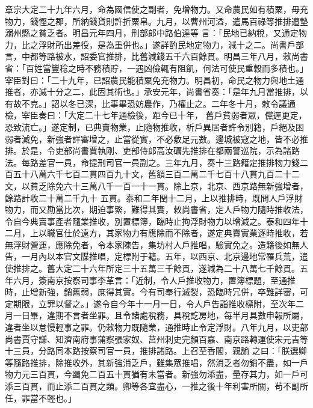 \begin{pinyinscope}
 章宗大定二十九年六月，命為國信使之副者，免增物力。又命農民如有積粟，毋充物力，錢慳之郡，所納錢貨則許折粟帛。九月，以曹州河溢，遣馬百祿等推排遭墊溺州縣之貧乏者。明昌元年四月，刑部郎中路伯達等
 言：「民地已納稅，又通定物力，比之浮財所出差役，是為重併也。」遂詳酌民地定物力，減十之二。尚書戶部言，中都等路被水，詔委官推排，比舊減錢五千六百餘貫。明昌三年八月，敕尚書省：「百姓當豐稔之時不務積貯，一遇凶儉輒有阻飢，何法可使民重穀而多積也。」宰臣對曰：「二十九年，已詔農民能積粟免充物力。明昌初，命民之物力與地土通推者，亦減十分之二，此固其術也。」承安元年，尚書省奏：「是年九月當推排，以有故不克。」詔以冬已深，比事畢恐妨農作，乃權止之。二年冬十月，敕令議通檢，宰臣奏曰：「大定二十七年通檢後，距今已十年，
 舊戶貧弱者眾，儻遲更定，恐致流亡。」遂定制，已典賣物業，止隨物推收，析戶異居者許令別籍，戶絕及困弱者減免，新強者詳審增之，止當從實，不必敷足元數。邊城被寇之地，皆不必推排。於是，令吏部尚書賈執剛、吏部侍郎高汝礪先推排在都兩警巡院，示為諸路法。每路差官一員，命提刑司官一員副之。三年九月，奏十三路籍定推排物力錢二百五十八萬六千七百二貫四百九十文，舊額三百二萬二千七百十八貫九百二十二文，以貧乏除免六十三萬八千一百一十一貫。除上京，北京、西京路無新強增者，餘路計收二十萬二千九十
 五貫。泰和二年閏十二月，上以推排時，既問人戶浮財物力，而又勘當比次，期迫事繁，難得其實，敕尚書省，定人戶物力隨時推收法，令自今典賣事產者隨業推收，別置標簿，臨時止拘浮財物力以增減之。泰和四年十二月，上以職官仕於遠方，其家物力有應除而不除者，遂定典賣實業逐時推收，若無浮財營運，應除免者，令本家陳告，集坊村人戶推唱，驗實免之。造籍後如無人告，一月內以本官文牒推唱，定標附于籍。五年，以西京、北京邊地常罹兵荒，遣使推排之。舊大定二十六年所定三十五萬三千餘貫，遂減為二十八萬七千餘貫。五
 年六月，簽南京按察司事李革言：「近制，令人戶推收物力，置簿標題，至通推時，止增新強，銷舊弱，庶得其實。今有司奉行滅裂，恐臨時冗併，卒難詳審，可定期限，立罪以督之。」遂令自今年十一月一日，令人戶告詣推收標附，至次年二月一日畢，違期不言者坐罪。且令諸處稅務，具稅訖房地，每半月具數申報所屬，違者坐以怠慢輕事之罪。仍敕物力既隨業，通推時止令定浮財。八年九月，以吏部尚書賈守謙、知濟南府事蒲察張家奴、莒州刺史完顏百嘉、南京路轉運使宋元吉等十三員，分路同本路按察司官一員，推排諸路。上召至香閣，親諭
 之曰：「朕選卿等隨路推排，除推收外，其新強消乏戶，雖集眾推唱，然消乏者勿銷不盡，如一戶物力元三百貫，今蠲免二百五十貫猶有未當者。新強勿添盡，量存其力，如一戶可添三百貫，而止添二百貫之類。卿等各宜盡心，一推之後十年利害所關，茍不副所任，罪當不輕也。」



\end{pinyinscope}